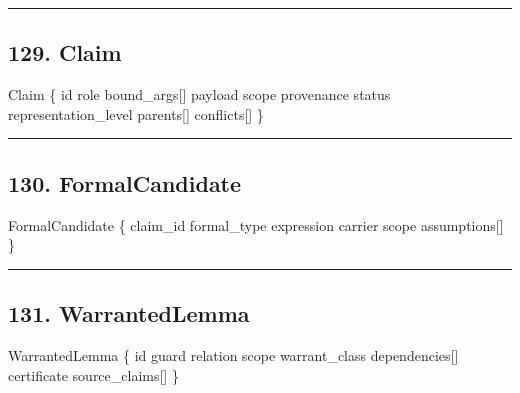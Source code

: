\documentclass[
]{article}
\newenvironment{Shaded}{}{}
\newcommand{\NormalTok}[1]{#1}
\begin{document}
\begin{center}\rule{0.5\linewidth}{0.5pt}\end{center}

\subsection{129. Claim}\label{claim}

\begin{Shaded}
\begin{Highlighting}[]
\NormalTok{Claim \{}
\NormalTok{    id}
\NormalTok{    role}
\NormalTok{    bound\_args[]}
\NormalTok{    payload}
\NormalTok{    scope}
\NormalTok{    provenance}
\NormalTok{    status}
\NormalTok{    representation\_level}
\NormalTok{    parents[]}
\NormalTok{    conflicts[]}
\NormalTok{\}}
\end{Highlighting}
\end{Shaded}

\begin{center}\rule{0.5\linewidth}{0.5pt}\end{center}

\subsection{130. FormalCandidate}\label{formalcandidate}

\begin{Shaded}
\begin{Highlighting}[]
\NormalTok{FormalCandidate \{}
\NormalTok{    claim\_id}
\NormalTok{    formal\_type}
\NormalTok{    expression}
\NormalTok{    carrier}
\NormalTok{    scope}
\NormalTok{    assumptions[]}
\NormalTok{\}}
\end{Highlighting}
\end{Shaded}

\begin{center}\rule{0.5\linewidth}{0.5pt}\end{center}

\subsection{131. WarrantedLemma}\label{warrantedlemma}

\begin{Shaded}
\begin{Highlighting}[]
\NormalTok{WarrantedLemma \{}
\NormalTok{    id}
\NormalTok{    guard}
\NormalTok{    relation}
\NormalTok{    scope}
\NormalTok{    warrant\_class}
\NormalTok{    dependencies[]}
\NormalTok{    certificate}
\NormalTok{    source\_claims[]}
\NormalTok{\}}
\end{Highlighting}
\end{Shaded}
\end{document}
